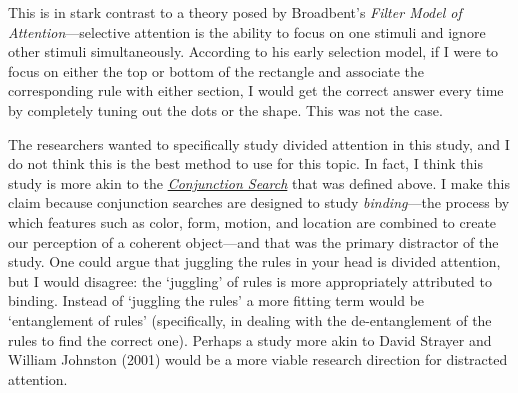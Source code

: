 \documentclass[stu,12pt,floatsintext]{apa7}
\begin{document}
This is in stark contrast to a theory posed by Broadbent's \textit{Filter Model of Attention}---selective attention is the ability to focus on one stimuli and ignore other stimuli simultaneously. According to his early selection model, if I were to focus on either the top or bottom of the rectangle and associate the corresponding rule with either section, I would get the correct answer every time by completely tuning out the dots or the shape. This was not the case.

\hypertarget{last}{}The researchers wanted to specifically study divided attention in this study, and I do not think this is the best method to use for this topic. In fact, I think this study is more akin to the \hyperlink{Conjunction}{\textit{Conjunction Search}} that was defined above. I make this claim because conjunction searches are designed to study \textit{binding}---the process by which features such as color, form, motion, and location are combined to create our perception of a coherent object---and that was the primary distractor of the study. One could argue that juggling the rules in your head is divided attention, but I would disagree: the `juggling' of rules is more appropriately attributed to binding. Instead of `juggling the rules' a more fitting term would be `entanglement of rules' (specifically, in dealing with the de-entanglement of the rules to find the correct one). Perhaps a study more akin to David Strayer and William Johnston (2001) would be a more viable research direction for distracted attention.

\newpage
\end{document}
